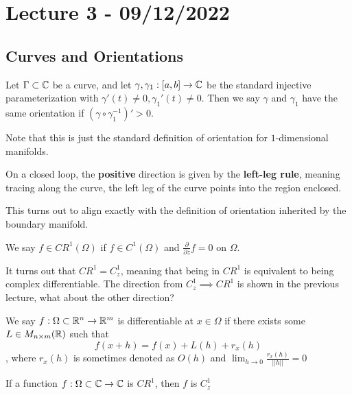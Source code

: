 \section{Lecture 3 - 09/12/2022}

\subsection{Curves and Orientations}

\begin{definition}
Let $\Gamma \subset \mathbb{C}$ be a curve, and let $\gamma, \gamma_1: [a, b] \to \mathbb{C}$ be the standard injective parameterization with $\gamma'(t) \neq 0, \gamma_1'(t) \neq 0$. Then we say $\gamma$ and $\gamma_1$ have the same orientation if $(\gamma \circ \gamma_1^{-1})' > 0$.
\end{definition}

Note that this is just the standard definition of orientation for $1$-dimensional manifolds.

On a closed loop, the \textbf{positive} direction is given by the \textbf{left-leg rule}, meaning tracing along the curve, the left leg of the curve points into the region enclosed.

This turns out to align exactly with the definition of orientation inherited by the boundary manifold.

\begin{definition}
We say $f \in CR^1(\Omega)$ if $f \in C^1(\Omega)$ and $\frac{\partial}{\partial \overline{z}} f = 0$ on $\Omega$.
\end{definition}

\begin{remark}
    It turns out that $CR^1 = C^1_z$, meaning that being in $CR^1$ is equivalent to being complex differentiable. The direction from $C^1_z \implies CR^1$ is shown in the previous lecture, what about the other direction?
\end{remark}

\begin{definition}
We say $f: \Omega \subset \mathbb{R}^n \to \mathbb{R}^m$ is differentiable at $x \in \Omega$ if there exists some $L \in M_{n \times m}(\mathbb{R})$ such that
\[f(x + h) = f(x) + L(h) + r_x(h)\]
, where $r_x(h)$ is sometimes denoted as $O(h)$ and $\lim_{h \to 0} \frac{r_x(h)}{||h||} = 0$
\end{definition}

\begin{proposition}
    If a function $f: \Omega \subset \mathbb{C} \to \mathbb{C}$ is $CR^1$, then $f$ is $C_z^1$
\end{proposition}


